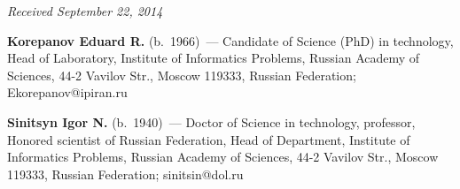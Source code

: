 \vspace*{-3pt}

\hfill{\small\textit{Received September 22, 2014}}


\Contr

\noindent
\textbf{Korepanov Eduard R.} (b.\ 1966)~--- Candidate of Science (PhD) in
technology, Head of Laboratory, Institute of Informatics Problems,
Russian Academy of Sciences, 44-2 Vavilov Str., Moscow 119333,
Russian Federation; Ekorepanov@ipiran.ru

\vspace*{3pt}

\noindent
\textbf{Sinitsyn Igor N.} (b.\ 1940)~---
Doctor of Science in technology, professor, Honored scientist of
Russian Federation, Head of Department, Institute of Informatics Problems,
Russian Academy of Sciences, 44-2 Vavilov Str., Moscow 119333,
Russian Federation; sinitsin@dol.ru
\label{end\stat}

\renewcommand{\bibname}{\protect\rm Литература}